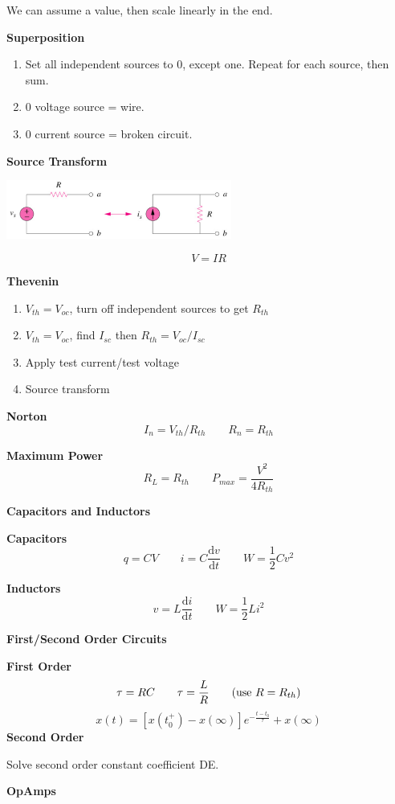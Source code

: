\documentclass[10pt]{article}
\newcommand{\sqb}[1]{\left[#1\right]}
\newcommand{\dv}[2]{\frac{\mathrm{d} #1}{\mathrm{d} #2}}
\newcommand\sectionheading[1]{\begin{center}\large{\textbf{#1}}\end{center}\normalsize}
\newcommand\heading[1]{\textbf{#1}}
\begin{document}
\begin{multicols*}{3}
We can assume a value, then scale linearly in the end. 

\heading{Superposition}
\begin{enumerate}[topsep=0pt,noitemsep]
    \item Set all independent sources to 0, except one. Repeat for each source, then sum. 
    \item 0 voltage source = wire. 
    \item 0 current source = broken circuit.
\end{enumerate}

\heading{Source Transform}
\begin{center}
    \includegraphics[width=20em]{images/source_transform.png}
\end{center}
\[V=IR\]

\heading{Thevenin}
\begin{enumerate}[topsep=0pt,noitemsep]
    \item $V_{th}=V_{oc}$, turn off independent sources to get $R_{th}$
    \item $V_{th}=V_{oc}$, find $I_{sc}$ then $R_{th}=V_{oc}/I_{sc}$
    \item Apply test current/test voltage
    \item Source transform
\end{enumerate}

\heading{Norton}
\[I_n=V_{th}/R_{th}\qquad R_n=R_{th}\]

\heading{Maximum Power}
\[R_L=R_{th}\qquad P_{max}=\frac{V^2}{4R_{th}}\]

\sectionheading{Capacitors and Inductors}
\heading{Capacitors}
\[q=CV \qquad i=C\dv vt \qquad W=\frac 12 Cv^2\]

\heading{Inductors}
\[v=L\dv it \qquad W=\frac 12Li^2\]

\sectionheading{First/Second Order Circuits}
\textbf{First Order}
\[\tau=RC \qquad \tau=\frac LR\tag{use $R=R_{th}$}\]
\[x(t)=\sqb{x(t_0^+)-x(\infty)}e^{-\frac{t-t_0}{\tau}}+x(\infty)\]
\textbf{Second Order}

Solve second order constant coefficient DE. 

\sectionheading{OpAmps}


\end{multicols*}
\end{document}
